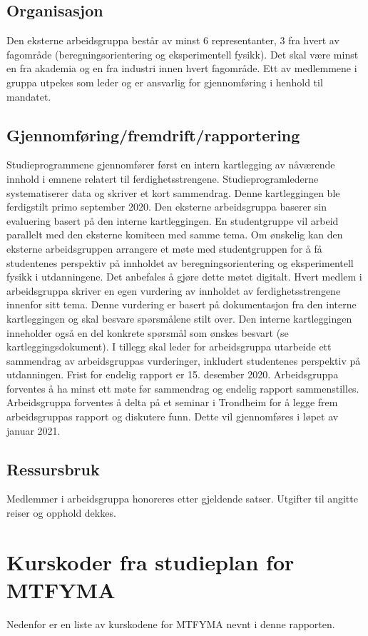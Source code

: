\documentclass{article}
\begin{document}
\subsection{Organisasjon}
Den eksterne arbeidsgruppa består av minst 6 representanter, 3 fra hvert av fagområde (beregningsorientering og eksperimentell fysikk). Det skal være minst en fra akademia og en fra industri innen hvert fagområde.
Ett av medlemmene i gruppa utpekes som leder og er ansvarlig for gjennomføring i henhold til mandatet.

\subsection{Gjennomføring/fremdrift/rapportering}
Studieprogrammene gjennomfører først en intern kartlegging av nåværende innhold i emnene relatert til ferdighetsstrengene. Studieprogramlederne systematiserer data og skriver et kort sammendrag. Denne kartleggingen ble ferdigstilt primo september 2020.
Den eksterne arbeidsgruppa baserer sin evaluering basert på den interne kartleggingen. En studentgruppe vil arbeid parallelt med den eksterne komiteen med samme tema. Om ønskelig kan den eksterne arbeidsgruppen arrangere et møte med studentgruppen for å få studentenes perspektiv på innholdet av beregningsorientering og eksperimentell fysikk i utdanningene. Det anbefales å gjøre dette møtet digitalt.
Hvert medlem i arbeidsgruppa skriver en egen vurdering av innholdet av ferdighetsstrengene innenfor sitt tema. Denne vurdering er basert på dokumentasjon fra den interne kartleggingen og skal besvare spørsmålene stilt over. Den interne kartleggingen inneholder også en del konkrete spørsmål som ønskes besvart (se kartleggingsdokument).
I tillegg skal leder for arbeidsgruppa utarbeide ett sammendrag av arbeidsgruppas vurderinger, inkludert studentenes perspektiv på utdanningen.
Frist for endelig rapport er 15. desember 2020.
Arbeidsgruppa forventes å ha minst ett møte før sammendrag og endelig rapport sammenstilles.
Arbeidsgruppa forventes å delta på et seminar i Trondheim for å legge frem arbeidsgruppas rapport og diskutere funn. Dette vil gjennomføres i løpet av januar 2021.

\subsection{Ressursbruk}
Medlemmer i arbeidsgruppa honoreres etter gjeldende satser.
Utgifter til angitte reiser og opphold dekkes.

\section{Kurskoder fra studieplan for MTFYMA}
Nedenfor er en liste av kurskodene for MTFYMA nevnt i denne rapporten.
\end{document}

